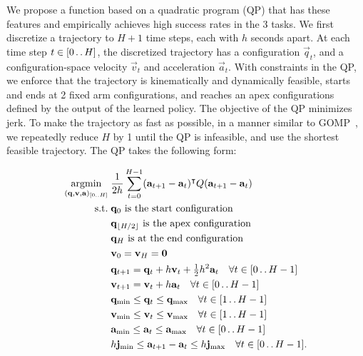 We propose a function based on a quadratic program (QP) that has these features and empirically achieves high success rates in the 3 tasks.  %
We first discretize a trajectory to $H+1$ time steps, each with $h$ seconds apart.  At each time step $t \in [0 \nobreak\mathinner{\ldotp\ldotp}\nobreak H]$, the discretized trajectory has a configuration $\vec{q}_t$, and a configuration-space velocity $\vec{v}_t$ and acceleration $\vec{a}_t$.  With constraints in the QP, we enforce that the trajectory is kinematically and dynamically feasible, starts and ends at 2 fixed arm configurations, and reaches an apex configurations defined by the output of the learned policy.  The objective of the QP minimizes jerk.  To make the trajectory as fast as possible, in a manner similar to GOMP~\cite{GOMP}, we repeatedly reduce $H$ by 1 until the QP is infeasible, and use the shortest feasible trajectory.  The QP takes the following form:
\begin{small}
\begin{align*}
    \argmin_{(\vec{q},\vec{v},\vec{a})_{\irange 0H}} \; & \frac 1{2h} \sum_{t=0}^{H-1} (\vec{a}_{t+1} - \vec{a}_{t})^{\intercal} Q (\vec{a}_{t+1} - \vec{a}_{t}) \\
    \text{s.t.} \; & \vec{q}_0 \text{ is the start configuration} \\
    & \vec{q}_{\lfloor H/2 \rfloor} \text{ is the apex configuration} \\
    & \vec{q}_H \text{ is at the end configuration} \\
    & \vec{v}_0 = \vec{v}_{H} = \vec{0} \\
    & \vec{q}_{t+1} = \vec{q}_t + h \vec{v}_t + \tfrac 12 h^2 \vec{a}_t \quad \forall t \in \irange 0{H-1} \\
    & \vec{v}_{t+1} = \vec{v}_t + h \vec{a}_t \quad \forall t \in \irange 0{H-1} \\
    & \vec{q}_\mathrm{min} \le \vec{q}_t \le \vec{q}_\mathrm{max} \quad \forall t \in \irange 1{H-1} \\
    & \vec{v}_\mathrm{min} \le \vec{v}_t \le \vec{v}_\mathrm{max} \quad \forall t \in \irange 1{H-1} \\
    & \vec{a}_\mathrm{min} \le \vec{a}_t \le \vec{a}_\mathrm{max} \quad \forall t \in \irange 0{H-1} \\
    & h \vec{j}_\mathrm{min} \le \vec{a}_{t+1} - \vec{a}_t \le h\vec{j}_\mathrm{max} \quad \forall t \in \irange 0{H-1}.
\end{align*}
\vspace*{-15pt}
\end{small}

